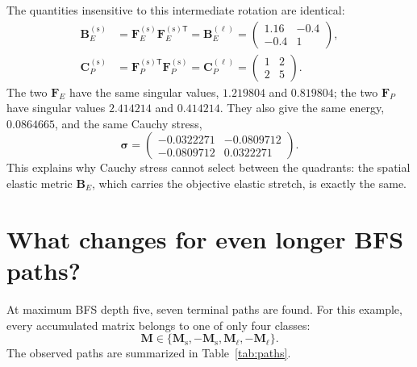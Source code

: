 \documentclass[11pt]{article}
\newcommand{\trans}{\mathsf{T}}
\newcommand{\shortp}{\mathrm{s}}
\newcommand{\longp}{\ell}
\begin{document}
The quantities insensitive to this intermediate rotation are identical:
\begin{align}
 \mathbf B_E^{(\shortp)}
 &=\mathbf F_E^{(\shortp)}\mathbf F_E^{(\shortp)\trans}
 =\mathbf B_E^{(\longp)}
 =\begin{pmatrix}1.16&-0.4\\-0.4&1\end{pmatrix},
 \\
 \mathbf C_P^{(\shortp)}
 &=\mathbf F_P^{(\shortp)\trans}\mathbf F_P^{(\shortp)}
 =\mathbf C_P^{(\longp)}
 =\begin{pmatrix}1&2\\2&5\end{pmatrix}.
 \label{eq:equalmetrics}
\end{align}
The two \(\mathbf F_E\) have the same singular values,
\(1.219804\) and \(0.819804\); the two \(\mathbf F_P\) have singular values
\(2.414214\) and \(0.414214\).  They also give the same energy,
\(0.0864665\), and the same Cauchy stress,
\begin{equation}
 \boldsymbol\sigma=
 \begin{pmatrix}
 -0.0322271&-0.0809712\\
 -0.0809712&0.0322271
 \end{pmatrix}.
\end{equation}
This explains why Cauchy stress cannot select between the quadrants: the
spatial elastic metric \(\mathbf B_E\), which carries the objective elastic
stretch, is exactly the same.

\section{What changes for even longer BFS paths?}

At maximum BFS depth five, seven terminal paths are found.  For this example,
every accumulated matrix belongs to one of only four classes:
\begin{equation}
 \mathbf M\in
 \{\mathbf M_{\shortp},-\mathbf M_{\shortp},
   \mathbf M_{\longp},-\mathbf M_{\longp}\}.
 \label{eq:Mclasses}
\end{equation}
The observed paths are summarized in Table~\ref{tab:paths}.
\end{document}
